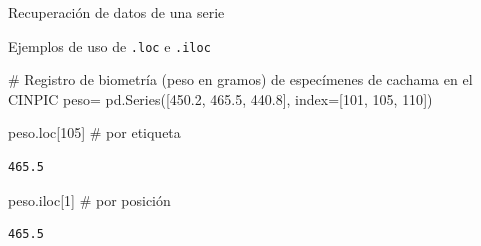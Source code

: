 \documentclass[
  ignorenonframetext,
  aspectratio=169,
  spanish,
]{beamer}
\newenvironment{Shaded}{\begin{snugshade}}{\end{snugshade}}
\newcommand{\CommentTok}[1]{\textcolor[rgb]{0.37,0.37,0.37}{#1}}
\newcommand{\DecValTok}[1]{\textcolor[rgb]{0.68,0.00,0.00}{#1}}
\newcommand{\FloatTok}[1]{\textcolor[rgb]{0.68,0.00,0.00}{#1}}
\newcommand{\NormalTok}[1]{\textcolor[rgb]{0.00,0.23,0.31}{#1}}
\newcommand{\OperatorTok}[1]{\textcolor[rgb]{0.37,0.37,0.37}{#1}}
\begin{document}
\begin{frame}[fragile]{Recuperación de datos de una serie}
\begin{block}{Ejemplos de uso de \texttt{.loc} e \texttt{.iloc}}
\begin{Shaded}
\begin{Highlighting}[]
\CommentTok{\# Registro de biometría (peso en gramos) de especímenes de cachama en el CINPIC}
\NormalTok{peso}\OperatorTok{=}\NormalTok{ pd.Series([}\FloatTok{450.2}\NormalTok{, }\FloatTok{465.5}\NormalTok{, }\FloatTok{440.8}\NormalTok{], index}\OperatorTok{=}\NormalTok{[}\DecValTok{101}\NormalTok{, }\DecValTok{105}\NormalTok{, }\DecValTok{110}\NormalTok{])}

\NormalTok{peso.loc[}\DecValTok{105}\NormalTok{]  }\CommentTok{\# por etiqueta }
\end{Highlighting}
\end{Shaded}

\begin{verbatim}
465.5
\end{verbatim}

\begin{Shaded}
\begin{Highlighting}[]
\NormalTok{peso.iloc[}\DecValTok{1}\NormalTok{]   }\CommentTok{\# por posición }
\end{Highlighting}
\end{Shaded}

\begin{verbatim}
465.5
\end{verbatim}
\end{block}
\end{frame}
\end{document}
